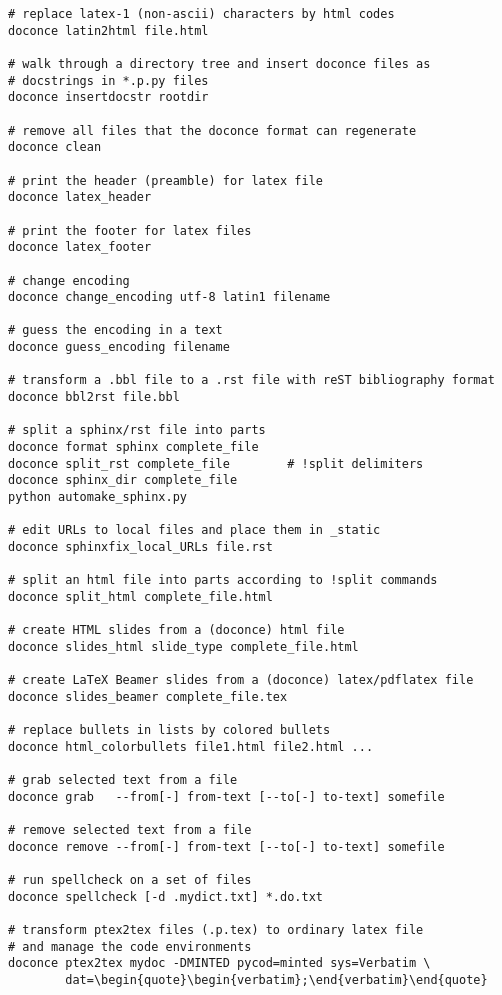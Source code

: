 \documentclass[%
oneside,                 %
final,                   %
10pt]{article}
\begin{document}
\begin{Verbatim}[numbers=none,fontsize=\fontsize{9pt}{9pt},baselinestretch=0.85,xleftmargin=0mm]
# replace latex-1 (non-ascii) characters by html codes
doconce latin2html file.html

# walk through a directory tree and insert doconce files as
# docstrings in *.p.py files
doconce insertdocstr rootdir

# remove all files that the doconce format can regenerate
doconce clean

# print the header (preamble) for latex file
doconce latex_header

# print the footer for latex files
doconce latex_footer

# change encoding
doconce change_encoding utf-8 latin1 filename

# guess the encoding in a text
doconce guess_encoding filename

# transform a .bbl file to a .rst file with reST bibliography format
doconce bbl2rst file.bbl

# split a sphinx/rst file into parts
doconce format sphinx complete_file
doconce split_rst complete_file        # !split delimiters
doconce sphinx_dir complete_file
python automake_sphinx.py

# edit URLs to local files and place them in _static
doconce sphinxfix_local_URLs file.rst

# split an html file into parts according to !split commands
doconce split_html complete_file.html

# create HTML slides from a (doconce) html file
doconce slides_html slide_type complete_file.html

# create LaTeX Beamer slides from a (doconce) latex/pdflatex file
doconce slides_beamer complete_file.tex

# replace bullets in lists by colored bullets
doconce html_colorbullets file1.html file2.html ...

# grab selected text from a file
doconce grab   --from[-] from-text [--to[-] to-text] somefile

# remove selected text from a file
doconce remove --from[-] from-text [--to[-] to-text] somefile

# run spellcheck on a set of files
doconce spellcheck [-d .mydict.txt] *.do.txt

# transform ptex2tex files (.p.tex) to ordinary latex file
# and manage the code environments
doconce ptex2tex mydoc -DMINTED pycod=minted sys=Verbatim \
        dat=\begin{quote}\begin{verbatim};\end{verbatim}\end{quote}


\end{Verbatim}
\end{document}
